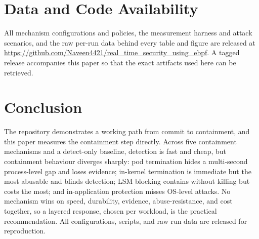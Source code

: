 \documentclass[10pt,conference]{IEEEtran}
\begin{document}
\section{Data and Code Availability}
All mechanism configurations and policies, the measurement harness and attack scenarios, and the raw per-run data behind every table and figure are released at \url{https://github.com/Naveen4421/real_time_security_using_ebpf}. A tagged release accompanies this paper so that the exact artifacts used here can be retrieved.

\section{Conclusion}
The repository demonstrates a working path from commit to containment, and this paper measures the containment step directly. Across five containment mechanisms and a detect-only baseline, detection is fast and cheap, but containment behaviour diverges sharply: pod termination hides a multi-second process-level gap and loses evidence; in-kernel termination is immediate but the most abusable and blinds detection; LSM blocking contains without killing but costs the most; and in-application protection misses OS-level attacks. No mechanism wins on speed, durability, evidence, abuse-resistance, and cost together, so a layered response, chosen per workload, is the practical recommendation. All configurations, scripts, and raw run data are released for reproduction.
\end{document}
